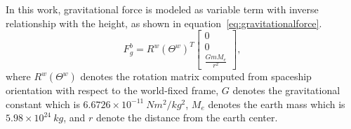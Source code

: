 In this work, gravitational force is modeled as variable term with inverse relationship with the height, as shown in equation~\ref{eq:gravitationalforce}.
\begin{equation}
F_g^b = R^w(\Theta^w)^T \begin{bmatrix} 0 \\ 0 \\ \frac{GmM_e}{r^2} \end{bmatrix} ,
\label{eq:gravitationalforce}
\end{equation}
 where $R^w(\Theta^w)$ denotes the rotation matrix computed from spaceship orientation with respect to the world-fixed frame, $G$ denotes the gravitational constant which is $6.6726\times10^{-11}~ Nm^2/kg^2$, $M_e$ denotes the earth mass which is $5.98\times10^{24}~kg$, and $r$ denote the distance from the earth center.


